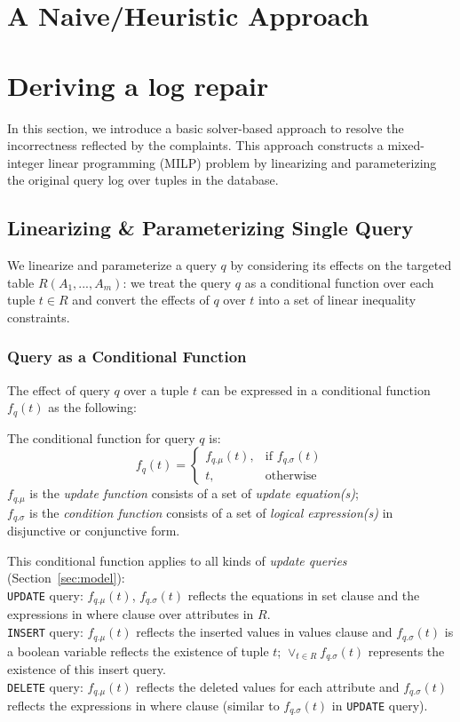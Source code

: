 \section{A Naive/Heuristic Approach}




\section{Deriving a log repair}
\label{sec:sol}
In this section, we 
introduce a basic solver-based approach to 
resolve the incorrectness reflected by the complaints. 
This approach 
constructs a mixed-integer linear 
programming (MILP) problem by
linearizing and parameterizing the 
original query log over tuples
in the database. 
\subsection{Linearizing \& Parameterizing Single Query}
\label{sec:linearize}
We linearize and parameterize a query $q$ by considering its effects on the 
targeted table $R(A_1, ..., A_m)$: we treat the query $q$ as a 
conditional function over each tuple $t\in R$ and convert the effects of $q$ 
over $t$ into a set of linear inequality constraints. 
\subsubsection{Query as a Conditional Function}
The effect of query $q$ over a tuple $t$ can be expressed in a conditional
function $f_q(t)$ as the following:
\begin{definition} 
\label{def:cond}
	The conditional function for query $q$ is:
	\[
    f_q(t)= 
\begin{cases}
    f_{q.\mu} (t) ,& \text{if } f_{q.\sigma} (t)\\
    t,              & \text{otherwise}
\end{cases}
\]
$f_{q.\mu}$ is the \textit{update function} consists of
 a set of \textit{update equation(s)};\\
 $f_{q.\sigma}$ is the 
 \textit{condition function} consists of a 
set of \textit{logical expression(s)} in 
disjunctive or conjunctive form.
\end{definition} 

 This conditional function applies 
to all kinds of \emph{update queries} (Section~\ref{sec:model}): \\
\texttt{UPDATE} query: $f_{q.\mu}(t)$, $f_{q.\sigma}(t)$ reflects the 
equations in
set clause and the expressions in where clause over attributes in
$R$. \\
\texttt{INSERT} query: $f_{q.\mu}(t)$ reflects the inserted values in
values clause and 
$f_{q.\sigma}(t)$ is a boolean variable 
reflects the existence of tuple $t$; 
$\vee_{t\in R} f_{q.\sigma}(t)$ 
represents
the existence of this insert query.  \\
\texttt{DELETE} query: $f_{q.\mu}(t)$ reflects the deleted values for 
each attribute and 
$f_{q.\sigma}(t)$ reflects the expressions in where clause (similar to
$f_{q.\sigma}(t)$ in \texttt{UPDATE} query).

